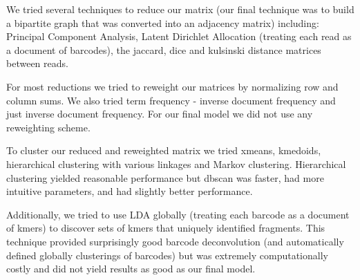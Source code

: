 We tried several techniques to reduce our matrix (our final technique was to build a bipartite graph that was converted into an adjacency matrix) including: Principal Component Analysis, Latent Dirichlet Allocation (treating each read as a document of barcodes), the jaccard, dice and kulsinski distance matrices between reads.

For most reductions we tried to reweight our matrices by normalizing row and column sums. We also tried term frequency - inverse document frequency and just inverse document frequency. For our final model we did not use any reweighting scheme.

To cluster our reduced and reweighted matrix we tried xmeans, kmedoids, hierarchical clustering with various linkages and Markov clustering. Hierarchical clustering yielded reasonable performance but dbscan was faster, had more intuitive parameters, and had slightly better performance.

Additionally, we tried to use LDA globally (treating each barcode as a document of kmers) to discover sets of kmers that uniquely identified fragments. This technique provided surprisingly good barcode deconvolution (and automatically defined globally clusterings of barcodes) but was extremely computationally costly and did not yield results as good as our final model.